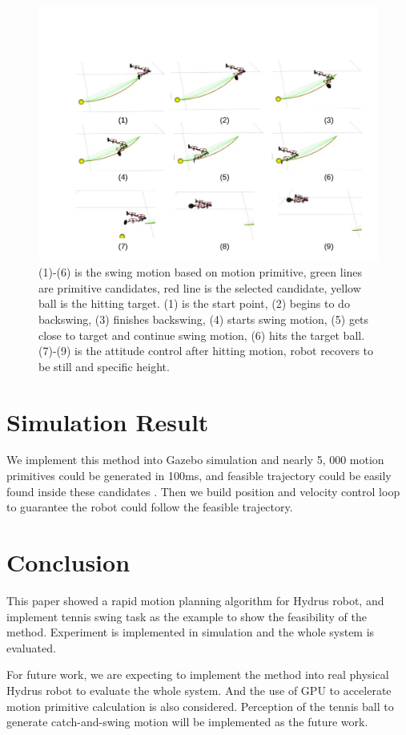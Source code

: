 \documentclass{jarticle}
\begin{document}
\begin{figure}[htb]
  \centering
  \includegraphics[clip, bb= 61 16 770 488,  width=\columnwidth]{figs_orig/primitive.pdf}
  \caption{(1)-(6) is the swing motion based on motion primitive, green lines are primitive candidates, red line is the selected candidate, yellow ball is the hitting target. (1) is the start point, (2) begins to do backswing, (3) finishes backswing, (4) starts swing motion, (5) gets close to target and continue swing motion, (6) hits the target ball.\newline (7)-(9) is the attitude control after hitting motion, robot recovers to be still and specific height. }
  \label{fig:primitive-image}
\end{figure}

\section{Simulation Result}
We implement this method into Gazebo simulation and nearly 5, 000 motion primitives could be generated in 100ms, and feasible trajectory could be easily found inside these candidates . Then we build position and velocity control loop to guarantee the robot could follow the feasible trajectory.

\section{Conclusion}
This paper showed a rapid motion planning algorithm for Hydrus robot, and implement tennis swing task as the example to show the feasibility of the method. Experiment is implemented in simulation and the whole system is evaluated.

For future work, we are expecting to implement the method into real physical Hydrus robot to evaluate the whole system. And the use of GPU to accelerate motion primitive calculation is also considered. Perception of the tennis ball to generate catch-and-swing motion will be implemented as the future work.

{\footnotesize


}
\end{document}
